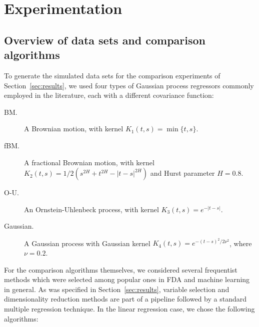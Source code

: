 \newpage
\section{Experimentation}\label{app:experimentation}

\subsection{Overview of data sets and comparison algorithms}\label{app:data-sets}

To generate the simulated data sets for the comparison experiments of Section~\ref{sec:results}, we used four types of Gaussian process regressors commonly employed in the literature, each with a different covariance function:
\begin{description}
    \item [BM.] A Brownian motion, with kernel \(K_1(t,s)=\min\{t,s\}\).
    \item [fBM.] A fractional Brownian motion, with kernel \(K_2(t,s)=1/2(s^{2H} + t^{2H} - |t-s|^{2H})\) and Hurst parameter \(H=0.8\).
    \item [O-U.] An Ornstein-Uhlenbeck process, with kernel \(K_3(t,s)=e^{-|t-s|}\).
    \item [Gaussian.] A Gaussian process with Gaussian kernel \(K_4(t,s)=e^{-(t-s)^2/2\nu^2}\), where \(\nu=0.2\).
\end{description}

For the comparison algorithms themselves, we considered several frequentist methods which were selected among popular ones in FDA and machine learning in general. As was specified in Section~\ref{sec:results}, variable selection and dimensionality reduction methods are part of a pipeline followed by a standard multiple regression technique. In the linear regression case, we chose the following algorithms:


